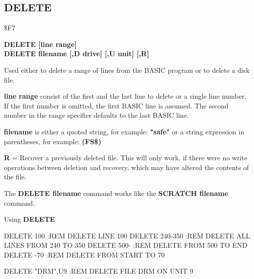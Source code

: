 
\newpage
\subsection{DELETE}
\begin{description}[leftmargin=3cm,style=nextline]
\item [Token:] \$F7
\item [Format:] {\bf DELETE [line range]} \\
                {\bf DELETE filename [,D drive] [,U unit] [,R]}
\item [Usage:] Used either to delete
               a range of lines from the BASIC program or
               to delete a disk file.

               {\bf line range} consist of the first and the last
               line to delete or a single line number.
               If the first number is omitted, the
               first BASIC line is assumed.
               The second number in the range specifier defaults
               to the last BASIC line.

   {\bf filename} is either a quoted string, for example: {\bf "safe"} or
   a string expression in parentheses, for example: {\bf (FS\$)}

   \drivedefinition

   \unitdefinition

   {\bf R} = Recover a previously deleted file.
   This will only work, if there were no write operations
   between deletion and recovery, which may have altered the
   contents of the file.

\item [Remarks:] The {\bf DELETE filename} command works like the
                 {\bf SCRATCH filename} command.

\item [Example:] Using {\bf DELETE}
\begin{screenoutput}
  DELETE 100      :REM DELETE LINE 100
  DELETE 240-350  :REM DELETE ALL LINES FROM 240 TO 350
  DELETE 500-     :REM DELETE FROM 500 TO END
  DELETE -70      :REM DELETE FROM START TO 70

  DELETE "DRM",U9 :REM DELETE FILE DRM ON UNIT 9
\end{screenoutput}
\end{description}


\newpage
